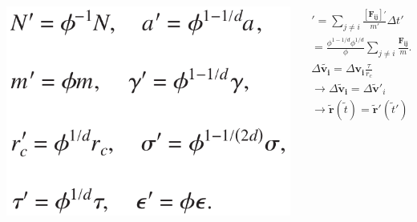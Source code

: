 \documentclass{beamer}
\begin{document}
\begin{frame}
\begin{columns}
\begin{column}{.4\textwidth}
    \includegraphics[width=\textwidth]{scaling.png}
\end{column}
\begin{column}{.6\textwidth}
    \begin{gather*}
        [\Delta \boldsymbol{v_i}]' = \sum_{j\neq i}\frac{[\boldsymbol{F_{ij}}]'}{m'} \Delta t' \\
        = \frac{\phi^{1-1/d}\phi^{1/d}}{\phi}\sum_{j\neq i}\frac{\boldsymbol{F_{ij}}}{m}\Delta t = \Delta \boldsymbol{v_i} \\
        \Delta \tilde{\boldsymbol{v_i}} = \Delta \boldsymbol{v_i}\frac{\tau}{r_c} \\
        \rightarrow \Delta \boldsymbol{\tilde{v}_i} = \Delta \boldsymbol{\tilde{v}}'_i \\
        \rightarrow \tilde{\boldsymbol{r}}(\tilde{t}) = \tilde{\boldsymbol{r}}'(\tilde{t}')
    \end{gather*}
\end{column}
\end{columns}
\end{frame}
\end{document}
